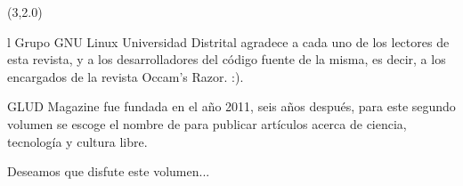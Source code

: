 \begin{textblock}{20}(3,2.0)

\begin{minipage}{.45\linewidth}
\colorbox{introcolor}{
\begin{minipage}{1\linewidth}

{{}{l Grupo GNU Linux Universidad Distrital agradece a cada uno de los lectores de esta revista, y a los desarrolladores del c\'odigo fuente de la misma, es decir, a los encargados de la revista Occam's Razor. :).


\bigskip

}
}

\end{minipage}
}

\vspace{6mm}

GLUD Magazine fue fundada en el año 2011, seis años después, para este segundo volumen se escoge el nombre de  para publicar artículos acerca de ciencia, tecnología  y cultura libre.

\bigskip

Deseamos que disfute este volumen...

\medskip

\begin{flushright}
{\Large{}}
\end{flushright}

\vspace{5cm}

\bigskip


\end{minipage}

\bigskip

\colorbox{introcolor}{
\begin{minipage}{.45\linewidth}

\bigskip

{\footnotesize{}}

\bigskip

\end{minipage}
}


\end{textblock}

\pagebreak
